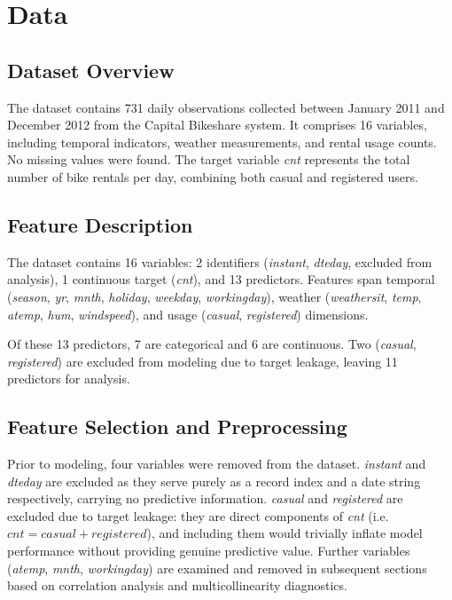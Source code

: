 \documentclass[12pt, a4paper]{article}
\begin{document}
\section{Data}

\subsection{Dataset Overview}
The dataset contains 731 daily observations collected between January 2011 and
December 2012 from the Capital Bikeshare system. It comprises 16 variables,
including temporal indicators, weather measurements, and rental usage counts.
No missing values were found. The target variable \textit{cnt} represents the
total number of bike rentals per day, combining both casual and registered users.

\subsection{Feature Description}
The dataset contains 16 variables: 2 identifiers (\textit{instant}, \textit{dteday},
excluded from analysis), 1 continuous target (\textit{cnt}), and 13 predictors.
Features span temporal (\textit{season}, \textit{yr}, \textit{mnth}, \textit{holiday},
\textit{weekday}, \textit{workingday}), weather (\textit{weathersit}, \textit{temp},
\textit{atemp}, \textit{hum}, \textit{windspeed}), and usage (\textit{casual},
\textit{registered}) dimensions. 

Of these 13 predictors, 7 are categorical and 6 are continuous.
Two (\textit{casual}, \textit{registered}) are excluded from modeling
due to target leakage, leaving 11 predictors for analysis.


\subsection{Feature Selection and Preprocessing}
Prior to modeling, four variables were removed from the dataset.
\textit{instant} and \textit{dteday} are excluded as they serve purely as
a record index and a date string respectively, carrying no predictive
information. \textit{casual} and \textit{registered} are excluded due to
target leakage: they are direct components of \textit{cnt} (i.e.\
$\textit{cnt} = \textit{casual} + \textit{registered}$), and including them
would trivially inflate model performance without providing genuine
predictive value. Further variables (\textit{atemp}, \textit{mnth},
\textit{workingday}) are examined and removed in subsequent sections based
on correlation analysis and multicollinearity diagnostics.
\end{document}
